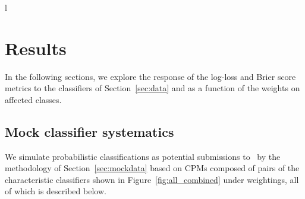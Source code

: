 l\section{Results}
\label{sec:results}

In the following sections, we explore the response of the log-loss and Brier score metrics to the classifiers of Section~\ref{sec:data} and as a function of the weights on affected classes.

\subsection{Mock classifier systematics}
\label{sec:mockresults}

We simulate probabilistic classifications as potential submissions to \plasticc\ by the methodology of Section~\ref{sec:mockdata} based on CPMs composed of pairs of the characteristic classifiers shown in Figure~\ref{fig:all_combined} under weightings, all of which is described below.

